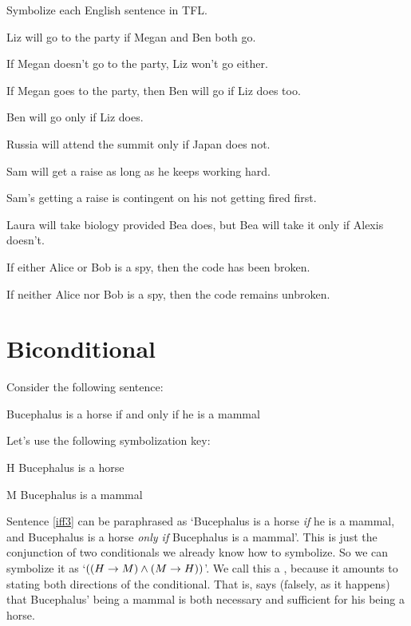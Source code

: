 \practiceproblems
\problempart Symbolize each English sentence in TFL.

\begin{earg}
\item Liz will go to the party if Megan and Ben both go.
\item If Megan doesn't go to the party, Liz won't go either.
\item If Megan goes to the party, then Ben will go if Liz does too.
\item Ben will go only if Liz does.
\item Russia will attend the summit only if Japan does not.
\item Sam will get a raise as long as he keeps working hard.
\item Sam's getting a raise is contingent on his not getting fired first.
\item Laura will take biology provided Bea does, but Bea will take it only if Alexis doesn't.
\item If either Alice or Bob is a spy, then the code has been broken.
\item If neither Alice nor Bob is a spy, then the code remains unbroken.
\end{earg}


\section{Biconditional}
Consider the following sentence:

	\begin{earg}
		\item[\ex{iff3}] Bucephalus is a horse if and only if he is a mammal
	\end{earg}
Let's use the following symbolization key:
	\begin{ekey}
		\item[H]  Bucephalus is a horse
		\item[M]  Bucephalus is a mammal
	\end{ekey}
Sentence \ref{iff3} can be paraphrased as `Bucephalus is a horse \emph{if} he is a mammal, and  Bucephalus is a horse \emph{only if}  Bucephalus is a mammal'. This is just the conjunction of two conditionals we already know how to symbolize.   So we can symbolize it as `$((H \rightarrow M) \wedge (M \rightarrow H))$'. We call this a , because it amounts to stating both directions of the conditional.  That is,  says (falsely, as it happens) that  Bucephalus' being a mammal is both necessary and sufficient for his being a horse.

